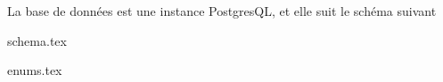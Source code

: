 La base de données est une instance PostgresQL, et elle suit le schéma suivant

{schema.tex}

{enums.tex}